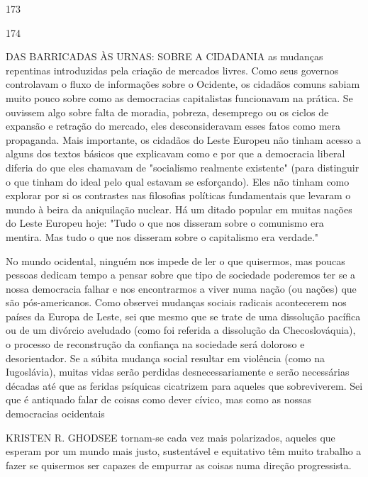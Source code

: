  \par 
173
 \par 
174
 \par 
DAS BARRICADAS ÀS URNAS: SOBRE A CIDADANIA as mudanças repentinas introduzidas pela criação de mercados livres. Como seus governos controlavam o fluxo de informações sobre o Ocidente, os cidadãos comuns sabiam muito pouco sobre como as democracias capitalistas funcionavam na prática. Se ouvissem algo sobre falta de moradia, pobreza, desemprego ou os ciclos de expansão e retração do mercado, eles desconsideravam esses fatos como mera propaganda. Mais importante, os cidadãos do Leste Europeu não tinham acesso a alguns dos textos básicos que explicavam como e por que a democracia liberal diferia do que eles chamavam de "socialismo realmente existente" (para distinguir o que tinham do ideal pelo qual estavam se esforçando). Eles não tinham como explorar por si os contrastes nas filosofias políticas fundamentais que levaram o mundo à beira da aniquilação nuclear. Há um ditado popular em muitas nações do Leste Europeu hoje: "Tudo o que nos disseram sobre o comunismo era mentira. Mas tudo o que nos disseram sobre o capitalismo era verdade."
 \par 
No mundo ocidental, ninguém nos impede de ler o que quisermos, mas poucas pessoas dedicam tempo a pensar sobre que tipo de sociedade poderemos ter se a nossa democracia falhar e nos encontrarmos a viver numa nação (ou nações) que são pós-americanos. Como observei mudanças sociais radicais acontecerem nos países da Europa de Leste, sei que mesmo que se trate de uma dissolução pacífica ou de um divórcio aveludado (como foi referida a dissolução da Checoslováquia), o processo de reconstrução da confiança na sociedade será doloroso e desorientador. Se a súbita mudança social resultar em violência (como na Iugoslávia), muitas vidas serão perdidas desnecessariamente e serão necessárias décadas até que as feridas psíquicas cicatrizem para aqueles que sobreviverem. Sei que é antiquado falar de coisas como dever cívico, mas como as nossas democracias ocidentais
 \par 
KRISTEN R. GHODSEE tornam-se cada vez mais polarizados, aqueles que esperam por um mundo mais justo, sustentável e equitativo têm muito trabalho a fazer se quisermos ser capazes de empurrar as coisas numa direção progressista.
 \par 
